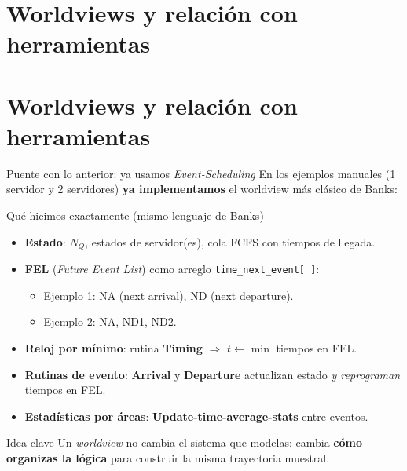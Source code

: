 \documentclass[aspectratio=1610, 9pt]{beamer}
\begin{document}
\section{Worldviews y relación con herramientas}


\section{Worldviews y relación con herramientas}

\begin{frame}{Puente con lo anterior: ya usamos \textit{Event-Scheduling} }
\small
En los ejemplos manuales (1 servidor y 2 servidores) \textbf{ya implementamos} el worldview más clásico de Banks:

\vspace{4pt}
\begin{block}{Qué hicimos exactamente (mismo lenguaje de Banks)}
\begin{itemize}
\item \textbf{Estado}: $N_Q$, estados de servidor(es), cola FCFS con tiempos de llegada.
\item \textbf{FEL} (\emph{Future Event List}) como arreglo \texttt{time\_next\_event[\,]}:
  \begin{itemize}
  \item Ejemplo 1: NA (next arrival), ND (next departure).
  \item Ejemplo 2: NA, ND1, ND2.
  \end{itemize}
\item \textbf{Reloj por mínimo}: rutina \textbf{Timing} $\Rightarrow$ $t\leftarrow\min$ tiempos en FEL.
\item \textbf{Rutinas de evento}: \textbf{Arrival} y \textbf{Departure} actualizan estado \emph{y reprograman} tiempos en FEL.
\item \textbf{Estadísticas por áreas}: \textbf{Update-time-average-stats} entre eventos.
\end{itemize}
\end{block}

\vspace{2pt}
\begin{alertblock}{Idea clave}
Un \textit{worldview} no cambia el sistema que modelas: cambia \textbf{cómo organizas la lógica} para construir la misma trayectoria muestral.
\end{alertblock}
\end{frame}
\end{document}
